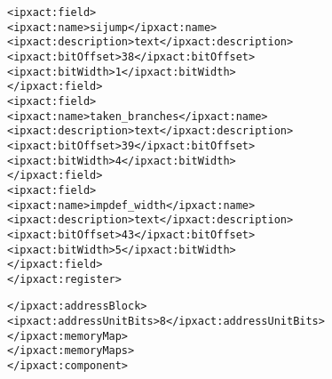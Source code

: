 \begin{alltt}
               <ipxact:field>
                  <ipxact:name>sijump</ipxact:name>
                  <ipxact:description>text</ipxact:description>
                  <ipxact:bitOffset>38</ipxact:bitOffset>
                  <ipxact:bitWidth>1</ipxact:bitWidth>
               </ipxact:field>
               <ipxact:field>
                  <ipxact:name>taken_branches</ipxact:name>
                  <ipxact:description>text</ipxact:description>
                  <ipxact:bitOffset>39</ipxact:bitOffset>
                  <ipxact:bitWidth>4</ipxact:bitWidth>
               </ipxact:field>
               <ipxact:field>
                  <ipxact:name>impdef_width</ipxact:name>
                  <ipxact:description>text</ipxact:description>
                  <ipxact:bitOffset>43</ipxact:bitOffset>
                  <ipxact:bitWidth>5</ipxact:bitWidth>
               </ipxact:field>
            </ipxact:register>

         </ipxact:addressBlock>
         <ipxact:addressUnitBits>8</ipxact:addressUnitBits>
      </ipxact:memoryMap>
   </ipxact:memoryMaps>
</ipxact:component>
\end{alltt}
